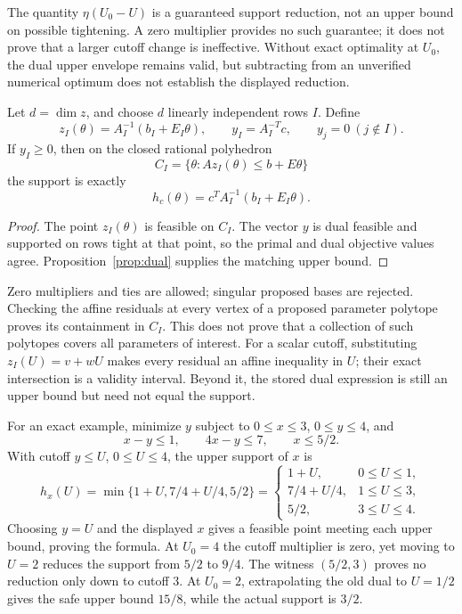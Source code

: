 The quantity $\eta(U_0-U)$ is a guaranteed support reduction, not an
upper bound on possible tightening. A zero multiplier provides no such
guarantee; it does not prove that a larger cutoff change is ineffective.
Without exact optimality at $U_0$, the dual upper envelope remains valid,
but subtracting from an unverified numerical optimum does not establish
the displayed reduction.

\begin{proposition}\label{prop:basis}
Let $d=\dim z$, and choose $d$ linearly independent rows $I$. Define
\[
 z_I(\theta)=A_I^{-1}(b_I+E_I\theta),\qquad
 y_I=A_I^{-T}c,\qquad y_j=0\ (j\notin I).
\]
If $y_I\ge0$, then on the closed rational polyhedron
\[
 C_I=\{\theta:Az_I(\theta)\le b+E\theta\}
\]
the support is exactly
\begin{equation}\label{eq:basis-value}
 h_c(\theta)=c^TA_I^{-1}(b_I+E_I\theta).
\end{equation}
\end{proposition}
\begin{proof}
The point $z_I(\theta)$ is feasible on $C_I$. The vector $y$ is dual
feasible and supported on rows tight at that point, so the primal and
dual objective values agree. Proposition~\ref{prop:dual} supplies the
matching upper bound.
\end{proof}

Zero multipliers and ties are allowed; singular proposed bases are
rejected. Checking the affine residuals at every vertex of a proposed
parameter polytope proves its containment in $C_I$. This does not prove
that a collection of such polytopes covers all parameters of interest.
For a scalar cutoff, substituting $z_I(U)=v+wU$ makes every residual an
affine inequality in $U$; their exact intersection is a validity interval.
Beyond it, the stored dual expression is still an upper bound but need
not equal the support.

For an exact example, minimize $y$ subject to $0\le x\le3$,
$0\le y\le4$, and
\[
 x-y\le1,\qquad 4x-y\le7,\qquad x\le5/2.
\]
With cutoff $y\le U$, $0\le U\le4$, the upper support of $x$ is
\begin{equation}\label{eq:cutoff-example}
 h_x(U)=\min\{1+U,7/4+U/4,5/2\}
 =\begin{cases}
 1+U,&0\le U\le1,\\
 7/4+U/4,&1\le U\le3,\\
 5/2,&3\le U\le4.
 \end{cases}
\end{equation}
Choosing $y=U$ and the displayed $x$ gives a feasible point meeting each
upper bound, proving the formula. At $U_0=4$ the cutoff multiplier is
zero, yet moving to $U=2$ reduces the support from $5/2$ to $9/4$.
The witness $(5/2,3)$ proves no reduction only down to cutoff $3$.
At $U_0=2$, extrapolating the old dual to $U=1/2$ gives the safe upper
bound $15/8$, while the actual support is $3/2$.

